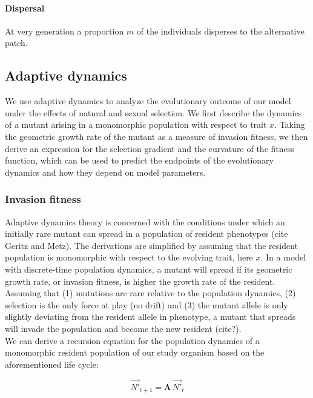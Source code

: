 \paragraph{Dispersal} At very generation a proportion $m$ of the individuals disperses to the alternative patch.

\subsection*{Adaptive dynamics}

We use adaptive dynamics to analyze the evolutionary outcome of our model under the effects of natural and sexual selection. We first describe the dynamics of a mutant arising in a monomorphic population with respect to trait $x$. Taking the geometric growth rate of the mutant as a measure of invasion fitness, we then derive an expression for the selection gradient and the curvature of the fitness function, which can be used to predict the endpoints of the evolutionary dynamics and how they depend on model parameters.

\subsubsection*{Invasion fitness}

Adaptive dynamics theory is concerned with the conditions under which an initially rare mutant can spread in a population of resident phenotypes (cite Geritz and Metz). The derivations are simplified by assuming that the resident population is monomorphic with respect to the evolving trait, here $x$. In a model with discrete-time population dynamics, a mutant will spread if its geometric growth rate, or invasion fitness, is higher the growth rate of the resident. Assuming that (1) mutations are rare relative to the population dynamics, (2) selection is the only force at play (no drift) and (3) the mutant allele is only slightly deviating from the resident allele in phenotype, a mutant that spreads will invade the population and become the new resident (cite?).\\

We can derive a recursion equation for the population dynamics of a monomorphic resident population of our study organism based on the aforementioned life cycle:

\begin{equation}
    \overrightarrow{N'}_{t+1} = \pmb{\Lambda} \, \overrightarrow{N'}_t
\end{equation}

